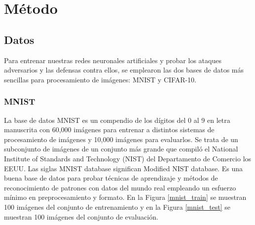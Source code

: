 \section{Método}

\subsection{Datos}
Para entrenar nuestras redes neuronales artificiales y probar los ataques adversarios y las defensas contra ellos, se emplearon las dos bases de datos más sencillas para procesamiento de imágenes: MNIST y CIFAR-10.

\subsubsection{MNIST}
La base de datos MNIST es un compendio de los dígitos del 0 al 9 en letra manuscrita con 60,000 imágenes para entrenar a distintos sistemas de procesamiento de imágenes y 10,000 imágenes para evaluarlos. Se trata de un subconjunto de imágenes de un conjunto más grande que compiló el National Institute of Standards and Technology (NIST) del Departamento de Comercio los EEUU. Las siglas MNIST database significan Modified NIST database. Es una buena base de datos para probar técnicas de aprendizaje y métodos de reconocimiento de patrones con datos del mundo real empleando un esfuerzo mínimo en preprocesamiento y formato. En la Figura \ref{mnist_train} se muestran 100 imágenes del conjunto de entrenamiento y en la Figura \ref{mnist_test} se muestran 100 imágenes del conjunto de evaluación.

